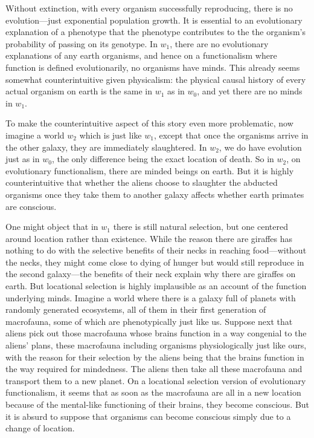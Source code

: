 Without extinction, with every organism successfully reproducing, there is no evolution---just exponential population
growth. It is essential to an evolutionary explanation of a phenotype that the phenotype contributes to the the organism's 
probability of passing on its genotype. In $w_1$, there are no evolutionary explanations of any earth organisms, and 
hence on a functionalism where function is defined evolutionarily, no organisms have minds. This already seems somewhat
counterintuitive given physicalism: the physical causal history of every actual organism on earth is the same in $w_1$ 
as in $w_0$, and yet there are no minds in $w_1$. 

To make the counterintuitive aspect of this story even more problematic, now imagine a world $w_2$ which is just like 
$w_1$, except that once the organisms arrive in the other galaxy, they are immediately slaughtered. In $w_2$, we do have
evolution just as in $w_0$, the only difference being the exact location of death. So in $w_2$, on evolutionary functionalism,
there are minded beings on earth. But it is highly counterintuitive that whether the aliens choose to slaughter the 
abducted organisms once they take them to another galaxy affects whether earth primates are conscious.

One might object that in $w_1$ there is still natural selection, but one centered around location rather than 
existence. While the reason there are giraffes has nothing to do with the selective benefits of their necks in 
reaching food---without the necks, they might come close to dying of hunger but would still reproduce in the second 
galaxy---the benefits of their neck explain why there are giraffes on earth. But locational selection is highly
implausible as an account of the function underlying minds. Imagine a world where there is a galaxy full of planets
with randomly generated ecosystems, all of them in their first generation of macrofauna, some of which are 
phenotypically just like us. Suppose next that aliens pick out those macrofauna whose brains function in a way 
congenial to the aliens' plans, these macrofauna including organisms physiologically just like ours, with the 
reason for their selection by the aliens being that the brains function in the way required for mindedness. 
The aliens then take all these macrofauna and transport them to a new planet. On a locational selection version 
of evolutionary functionalism, it seems that as soon as the macrofauna are all in a new location because of the 
mental-like functioning of their brains, they become conscious. But it is absurd to suppose that organisms can 
become conscious simply due to a change of location. 

